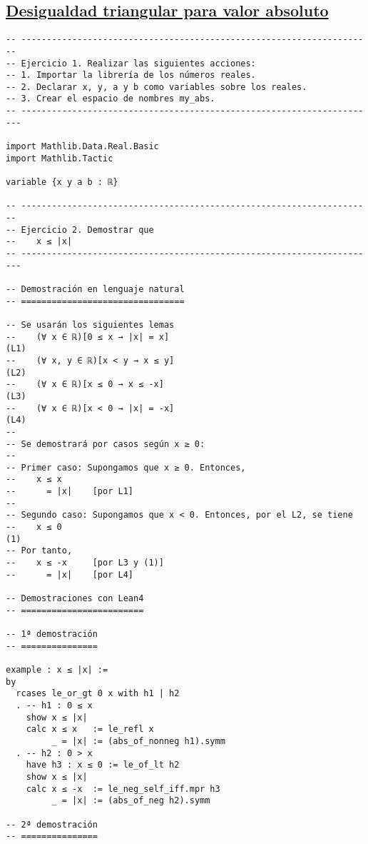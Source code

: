 \subsection{\href{./src/Logica/Desigualdad\_triangular\_para\_valor\_absoluto.lean}{Desigualdad triangular para valor absoluto}}
\label{sec:orgc8a94f4}
\begin{verbatim}
-- ---------------------------------------------------------------------
-- Ejercicio 1. Realizar las siguientes acciones:
-- 1. Importar la librería de los números reales.
-- 2. Declarar x, y, a y b como variables sobre los reales.
-- 3. Crear el espacio de nombres my_abs.
-- ----------------------------------------------------------------------

import Mathlib.Data.Real.Basic
import Mathlib.Tactic

variable {x y a b : ℝ}

-- ---------------------------------------------------------------------
-- Ejercicio 2. Demostrar que
--    x ≤ |x|
-- ----------------------------------------------------------------------

-- Demostración en lenguaje natural
-- ================================

-- Se usarán los siguientes lemas
--    (∀ x ∈ ℝ)[0 ≤ x → |x| = x]                                     (L1)
--    (∀ x, y ∈ ℝ)[x < y → x ≤ y]                                    (L2)
--    (∀ x ∈ ℝ)[x ≤ 0 → x ≤ -x]                                      (L3)
--    (∀ x ∈ ℝ)[x < 0 → |x| = -x]                                    (L4)
--
-- Se demostrará por casos según x ≥ 0:
--
-- Primer caso: Supongamos que x ≥ 0. Entonces,
--    x ≤ x
--      = |x|    [por L1]
--
-- Segundo caso: Supongamos que x < 0. Entonces, por el L2, se tiene
--    x ≤ 0                                                          (1)
-- Por tanto,
--    x ≤ -x     [por L3 y (1)]
--      = |x|    [por L4]

-- Demostraciones con Lean4
-- ========================

-- 1ª demostración
-- ===============

example : x ≤ |x| :=
by
  rcases le_or_gt 0 x with h1 | h2
  . -- h1 : 0 ≤ x
    show x ≤ |x|
    calc x ≤ x   := le_refl x
         _ = |x| := (abs_of_nonneg h1).symm
  . -- h2 : 0 > x
    have h3 : x ≤ 0 := le_of_lt h2
    show x ≤ |x|
    calc x ≤ -x  := le_neg_self_iff.mpr h3
         _ = |x| := (abs_of_neg h2).symm

-- 2ª demostración
-- ===============


\end{verbatim}

